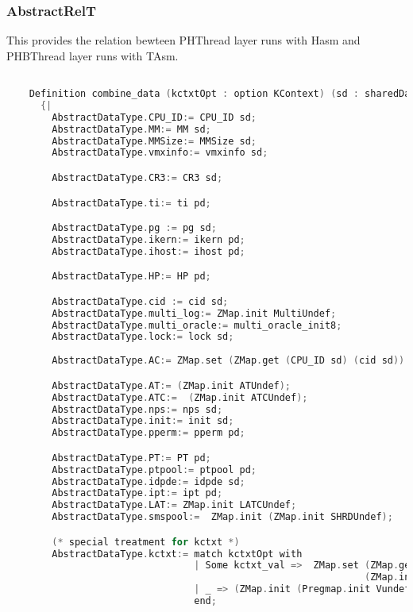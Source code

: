 \subsubsection{AbstractRelT}

This provides the relation bewteen PHThread layer runs with Hasm and PHBThread layer runs with TAsm. 

\begin{lstlisting}[language=C]

    Definition combine_data (kctxtOpt : option KContext) (sd : sharedData) (pd: privData) : AbstractDataType.RData :=
      {|
        AbstractDataType.CPU_ID:= CPU_ID sd;
        AbstractDataType.MM:= MM sd;
        AbstractDataType.MMSize:= MMSize sd;
        AbstractDataType.vmxinfo:= vmxinfo sd;

        AbstractDataType.CR3:= CR3 sd;

        AbstractDataType.ti:= ti pd;

        AbstractDataType.pg := pg sd;
        AbstractDataType.ikern:= ikern pd;
        AbstractDataType.ihost:= ihost pd;

        AbstractDataType.HP:= HP pd;

        AbstractDataType.cid := cid sd;
        AbstractDataType.multi_log:= ZMap.init MultiUndef;
        AbstractDataType.multi_oracle:= multi_oracle_init8;
        AbstractDataType.lock:= lock sd;
        
        AbstractDataType.AC:= ZMap.set (ZMap.get (CPU_ID sd) (cid sd)) (AC pd) (ZMap.init Container_unused); 

        AbstractDataType.AT:= (ZMap.init ATUndef);
        AbstractDataType.ATC:=  (ZMap.init ATCUndef);
        AbstractDataType.nps:= nps sd;
        AbstractDataType.init:= init sd;
        AbstractDataType.pperm:= pperm pd;

        AbstractDataType.PT:= PT pd;
        AbstractDataType.ptpool:= ptpool pd;
        AbstractDataType.idpde:= idpde sd;
        AbstractDataType.ipt:= ipt pd;
        AbstractDataType.LAT:= ZMap.init LATCUndef;
        AbstractDataType.smspool:=  ZMap.init (ZMap.init SHRDUndef);

        (* special treatment for kctxt *)
        AbstractDataType.kctxt:= match kctxtOpt with 
                                 | Some kctxt_val =>  ZMap.set (ZMap.get (CPU_ID sd) (cid sd)) kctxt_val 
                                                               (ZMap.init (Pregmap.init Vundef))
                                 | _ => (ZMap.init (Pregmap.init Vundef))
                                 end;
        

\end{lstlisting}
